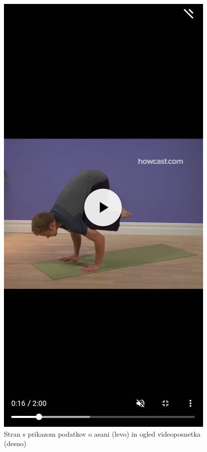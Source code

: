\documentclass[a4paper, 12pt]{book}
\begin{document}
\begin{figure}[ht]
\begin{minipage}[b]{0.32\textwidth}
  \end{minipage}
  \begin{minipage}[b]{0.32\textwidth}
    \includegraphics[width=\textwidth]{videoasana.jpg}\centering
  \end{minipage}
    \caption{Stran s prikazom podatkov o asani (levo) in ogled videoposnetka (desno)}
    \label{asana}
\end{figure}
\end{document}
